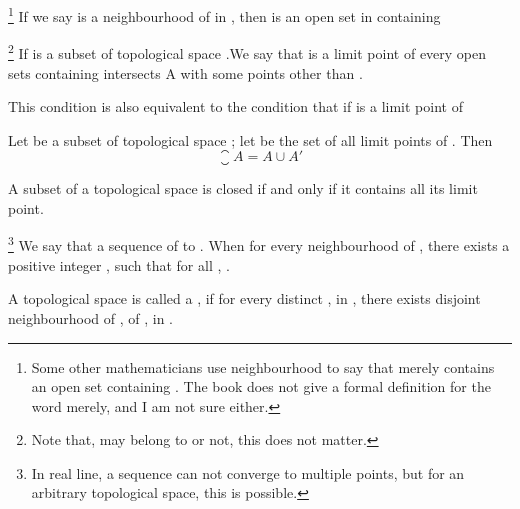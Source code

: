 \begin{definition}[neighbourhood]\label{def:Neighbourhood}\footnote{
      Some other mathematicians use neighbourhood to say that  merely contains an open set containing . The book does not give a formal definition for the word merely, and I am not sure either.
}
      If we say  is a neighbourhood of  in , then  is an open set in  containing 
\end{definition}

\begin{definition}\label{def:LimitPoint}\footnote{
      Note that,  may belong to  or not, this does not matter.
}
      If  is a subset of topological space .We say that  is a limit point of  \ioi every open sets containing  intersects A with some points other than .

      This condition is also equivalent to the condition that if  is a limit point of  \ioi {}
\end{definition}

\begin{theorem}\omitObviuos
      Let  be a subset of topological space ; let  be the set of all limit points of . Then
      \begin{equation*}
            \closure{A} = A \cup A'
      \end{equation*}
\end{theorem}

\begin{corollary}\omitObviuos
      A subset of a topological space is closed if and only if it contains all its limit point.
\end{corollary}

\begin{definition}[converge]\label{def:Converge}\footnote{
      In real line, a sequence can not converge to multiple points, but for an arbitrary topological space, this is possible.
}
      We say that a sequence of   to . When for every neighbourhood  of , there exists a positive integer , such that for all , .
\end{definition}

\begin{definition}\label{def:HausdorffSpace}
      A topological space is called a , if for every distinct ,  in , there exists disjoint neighbourhood of ,  of ,  in .
\end{definition}

